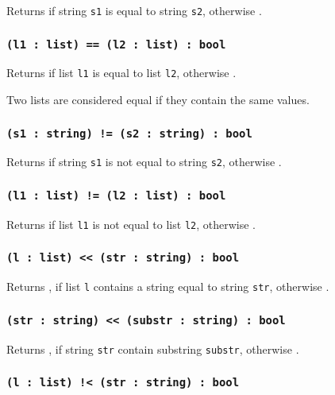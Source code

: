 Returns \true{} if string \texttt{s1} is equal to string \texttt{s2}, otherwise \false{}.

\subsubsection{\texttt{(l1 : list) == (l2 : list) : bool}}

Returns \true{} if list \texttt{l1} is equal to list \texttt{l2}, otherwise \false{}.

Two lists are considered equal if they contain the same values.

\subsubsection{\texttt{(s1 : string) != (s2 : string) : bool}}

Returns \false{} if string \texttt{s1} is not equal to string \texttt{s2}, otherwise \true{}.

\subsubsection{\texttt{(l1 : list) != (l2 : list) : bool}}

Returns \false{} if list \texttt{l1} is not equal to list \texttt{l2}, otherwise \true{}.

\subsubsection{\texttt{(l : list) << (str : string) : bool}}

Returns \true{}, if list \texttt{l} contains a string equal to string \texttt{str}, otherwise \false{}.

\subsubsection{\texttt{(str : string) << (substr : string) : bool}}

Returns \true{}, if string \texttt{str} contain substring \texttt{substr}, otherwise \false{}.

\subsubsection{\texttt{(l : list) !< (str : string) : bool}}

